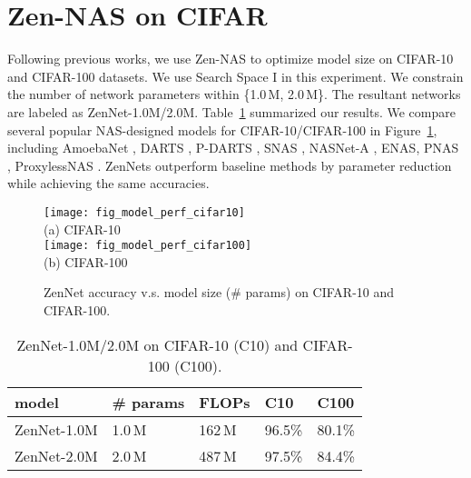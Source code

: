 \documentclass{article}
\providecommand{\citep}{\cite}
\begin{document}
\section{Zen-NAS on CIFAR}
\label{sec:Zen-NAS-on-CIFAR}

Following previous works, we use Zen-NAS to optimize model size on CIFAR-10 and CIFAR-100 datasets. We use Search Space I in this experiment. We constrain the number of network parameters within \{1.0\,M, 2.0\,M\}. The resultant networks are labeled as ZenNet-1.0M/2.0M. Table~\ref{tab:zen-net-for-cifar}   summarized our results. We compare several popular NAS-designed models for CIFAR-10/CIFAR-100 in Figure~\ref{fig:fig_model_perf_CIFAR-10_CIFAR-100}, including AmoebaNet \citep{realRegularizedEvolutionImage2019}, DARTS \citep{liuDARTSDifferentiableArchitecture2019}, P-DARTS \citep{chenProgressiveDARTSBridging2019}, SNAS \citep{xieSNASStochasticNeural2018}, NASNet-A \citep{zophLearningTransferableArchitectures2018}, ENAS\citep{phamEfficientNeuralArchitecture2018a}, PNAS \citep{liuProgressiveNeuralArchitecture2018}, ProxylessNAS \citep{cai_proxylessnas:_2019}. ZenNets outperform baseline methods by  parameter reduction while achieving the same accuracies.

\begin{figure}[!h]
  \begin{center}
    \texttt{[image: fig\_model\_perf\_cifar10]} \\
    (a) CIFAR-10 \\      
    \texttt{[image: fig\_model\_perf\_cifar100]} \\
    (b) CIFAR-100 \\
  \end{center}
\caption{ZenNet accuracy v.s. model size (\# params) on CIFAR-10 and CIFAR-100.} \label{fig:fig_model_perf_CIFAR-10_CIFAR-100}
\end{figure}

\begin{table}[!h]
\begin{center}
  \begin{tabular}{@{}lllll@{}}
    \toprule    
    model       & \# params    & FLOPs         & C10     & C100           \\ \midrule
    ZenNet-1.0M & 1.0\,M & 162\,M & 96.5\%    & 80.1\%               \\
    ZenNet-2.0M & 2.0\,M & 487\,M & 97.5\%      & 84.4\%            \\ \bottomrule
    \end{tabular}
\end{center}  
\caption{ZenNet-1.0M/2.0M on CIFAR-10 (C10) and CIFAR-100 (C100).}
\label{tab:zen-net-for-cifar}
\end{table}
\end{document}
